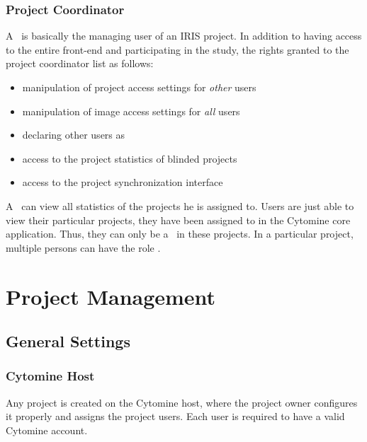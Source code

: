 \subsection{Project Coordinator}
A \pjcoord\ is basically the managing user of an IRIS project. 
In addition to having access to the entire front-end and participating in the study, the rights granted to the project coordinator list as follows:
\begin{itemize}
\item manipulation of project access settings for \emph{other} users
\item manipulation of image access settings for \emph{all} users
\item declaring other users as \pjcoord
\item access to the project statistics of blinded projects
\item access to the project synchronization interface
\end{itemize}

A \pjcoord\ can view all statistics of the projects he is assigned to. 
Users are just able to view their particular projects, they have been assigned to in the Cytomine core application.
Thus, they can only be a \pjcoord\ in these projects. 
In a particular project, multiple persons can have the role \pjcoord . 

%



\chapter{Project Management}

\section{General Settings}
\subsection{Cytomine Host}
Any project is created on the Cytomine host, where the project owner configures it properly and assigns the project users. 
Each user is required to have a valid Cytomine account. 

